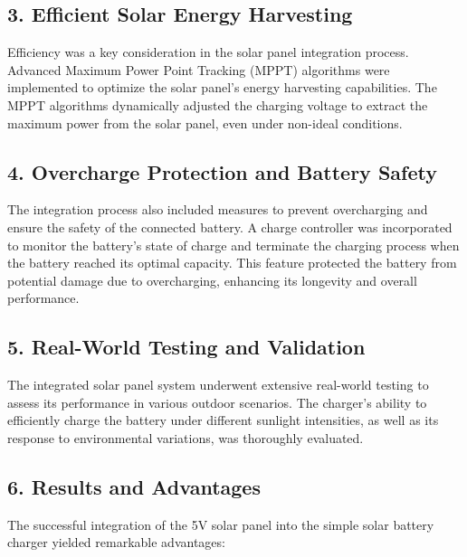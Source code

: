 \documentclass[twocolumn]{article}
\begin{document}
\subsection*{3. Efficient Solar Energy Harvesting}

Efficiency was a key consideration in the solar panel integration process. Advanced Maximum Power Point Tracking (MPPT) algorithms were implemented to optimize the solar panel's energy harvesting capabilities. The MPPT algorithms dynamically adjusted the charging voltage to extract the maximum power from the solar panel, even under non-ideal conditions.

\subsection*{4. Overcharge Protection and Battery Safety}

The integration process also included measures to prevent overcharging and ensure the safety of the connected battery. A charge controller was incorporated to monitor the battery's state of charge and terminate the charging process when the battery reached its optimal capacity. This feature protected the battery from potential damage due to overcharging, enhancing its longevity and overall performance.

\subsection*{5. Real-World Testing and Validation}

The integrated solar panel system underwent extensive real-world testing to assess its performance in various outdoor scenarios. The charger's ability to efficiently charge the battery under different sunlight intensities, as well as its response to environmental variations, was thoroughly evaluated.

\subsection*{6. Results and Advantages}

The successful integration of the 5V solar panel into the simple solar battery charger yielded remarkable advantages:
\end{document}
